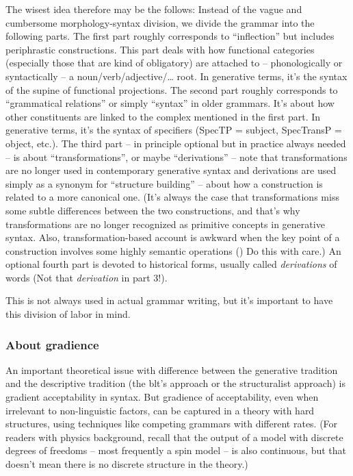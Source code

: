 \documentclass[UTF8, a4paper, oneside, scheme=plain]{ctexrep}
\newcommand*{\term}[1]{\emph{#1}}
\begin{document}
The wisest idea therefore may be the follows:
Instead of the vague and cumbersome morphology-syntax division,
we divide the grammar into the following parts.
The first part roughly corresponds to ``inflection'' 
but includes periphrastic constructions.
This part deals with how functional categories 
(especially those that are kind of obligatory) are attached to 
-- phonologically or syntactically -- a noun/verb/adjective/\dots{} root.
In generative terms, it's the syntax of the supine of functional projections.
The second part roughly corresponds to ``grammatical relations''
or simply ``syntax'' in older grammars.
It's about how other constituents are linked to the complex mentioned in the first part.
In generative terms, it's the syntax of specifiers (SpecTP = subject, SpecTransP = object, etc.).
The third part -- in principle optional but in practice always needed -- 
is about ``transformations'', or maybe ``derivations'' 
-- note that transformations are no longer used in contemporary generative syntax 
and derivations are used simply as a synonym for ``structure building'' -- 
about how a construction is related to a more canonical one.
(It's always the case that transformations miss some subtle differences between the two constructions,
and that's why transformations are no longer recognized as primitive concepts in generative syntax.
Also, transformation-based account is awkward 
when the key point of a construction involves some highly semantic operations 
()
Do this with care.)
An optional fourth part is devoted to historical forms,
usually called \term{derivations} of words (Not that \term{derivation} in part 3!).

This is not always used in actual grammar writing,
but it's important to have this division of labor in mind.



\subsubsection{About gradience}

An important theoretical issue with difference between the generative tradition 
and the descriptive tradition (the \acs{blt}'s approach or the structuralist approach)
is gradient acceptability in syntax.
But gradience of acceptability, 
even when irrelevant to non-linguistic factors, 
can be captured in a theory with hard structures,
using techniques like competing grammars with different rates.
(For readers with physics background,
recall that the output of a model with discrete degrees of freedoms 
-- most frequently a spin model -- is also continuous,
but that doesn't mean there is no discrete structure in the theory.)
\end{document}
